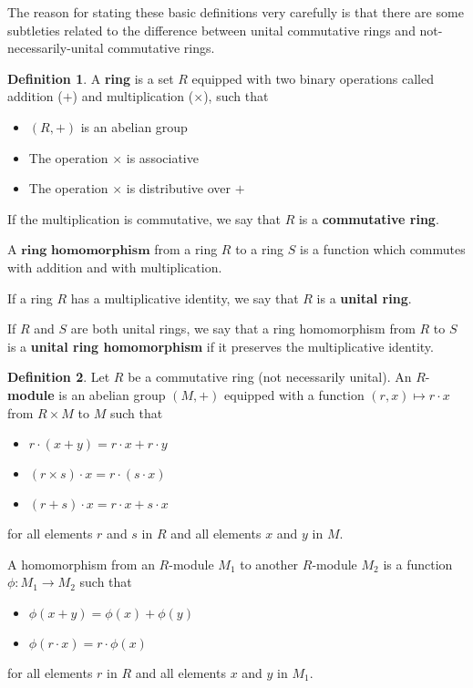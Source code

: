 \documentclass[a4paper]{article}
\theoremstyle{definition}
\newtheorem{definition}{Definition}[section]
\theoremstyle{remark}
\newcommand{\defhl}[1]{\textbf{#1}}
\begin{document}
The reason for stating these basic definitions very carefully is that there are some subtleties related to the difference between unital commutative rings and not-necessarily-unital commutative rings.




\begin{definition}
A \defhl{ring} is a set $R$ equipped with two binary operations called addition ($+$) and multiplication ($\times$), such that 
\begin{itemize}
\item $(R, +)$ is an abelian group
\item The operation $\times$ is associative
\item The operation $\times$ is distributive over $+$
\end{itemize}
If the multiplication is commutative, we say that $R$ is a \defhl{commutative ring}.

A $\defhl{ring homomorphism}$ from a ring $R$ to a ring $S$ is a function which commutes with addition and with multiplication.

If a ring $R$ has a multiplicative identity, we say that $R$ is a \defhl{unital ring}.

If $R$ and $S$ are both unital rings, we say that a ring homomorphism from $R$ to $S$ is a \defhl{unital ring homomorphism} if it preserves the multiplicative identity.

\end{definition}



\begin{definition}
Let $R$ be a commutative ring (not necessarily unital). An $R$-\defhl{module} is an abelian group $(M, +)$ equipped with a function $(r, x) \mapsto r\cdot x$ from $R \times M$ to $M$ such that
\begin{itemize}
\item $r \cdot (x+y) = r \cdot x + r \cdot y$
\item $(r \times s) \cdot x = r \cdot (s \cdot x)$
\item $ (r+s) \cdot x = r \cdot x + s \cdot x$
\end{itemize}
for all elements $r$ and $s$ in $R$ and all elements $x$ and $y$ in $M$.

A homomorphism from an $R$-module $M_1$ to another $R$-module $M_2$ is a function $\phi : M_1 \to M_2$ such that 
\begin{itemize}
\item $\phi(x+y) = \phi(x) + \phi(y)$
\item $\phi(r \cdot x) = r \cdot \phi(x)$
\end{itemize}
for all elements $r$ in $R$ and all elements $x$ and $y$ in $M_1$.

\end{definition}
\end{document}
